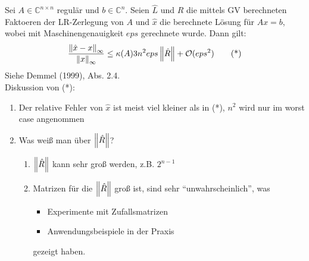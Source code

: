 \satz Sei $A \in \mathbb{C}^{n \times n}$ regulär und $b \in \mathbb{C}^n$. Seien $\hat{L}$ und $\hat{R}$ die mittels GV
berechneten Faktoeren der LR-Zerlegung von $A$ und $\hat{x}$ die berechnete Lösung für $Ax = b$, wobei mit
Maschinengenauigkeit $eps$ gerechnete wurde. Dann gilt:
\begin{align*}
  \frac{\left\lVert \hat{x}-x \right\rVert_\infty}{\left\lVert x \right\rVert_\infty} \leq \kappa(A) 3n^2 eps \left\lVert \hat{R} \right\rVert + \mathcal{O}(eps^2) \tag{*}
\end{align*}
\beweis Siehe Demmel (1999), Abs. 2.4.\\
Diskussion von (*):
\begin{enumerate}
  \item Der relative Fehler von $\hat{x}$ ist meist viel kleiner als in (*), $n^2$ wird nur im worst case angenommen
  \item Was weiß man über $\left\lVert \hat{R} \right\rVert$?
    \begin{enumerate}[i]
      \item $\left\lVert \hat{R} \right\rVert$ kann sehr groß werden, z.B. $2^{n-1}$
      \item Matrizen für die $\left\lVert \hat{R} \right\rVert$ groß ist, sind sehr ``unwahrscheinlich'', was
        \begin{itemize}
          \item Experimente mit Zufallsmatrizen
          \item Anwendungsbeispiele in der Praxis
        \end{itemize}
        gezeigt haben.
    \end{enumerate}
\end{enumerate}


